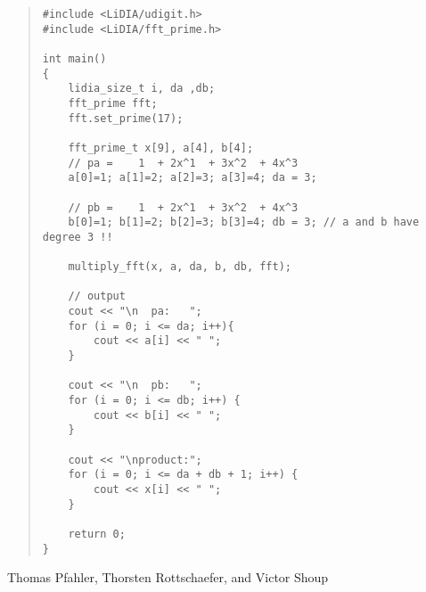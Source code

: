 \begin{quote}
\begin{verbatim}
#include <LiDIA/udigit.h>
#include <LiDIA/fft_prime.h>

int main()
{
    lidia_size_t i, da ,db;
    fft_prime fft;
    fft.set_prime(17);

    fft_prime_t x[9], a[4], b[4];
    // pa =    1  + 2x^1  + 3x^2  + 4x^3
    a[0]=1; a[1]=2; a[2]=3; a[3]=4; da = 3;

    // pb =    1  + 2x^1  + 3x^2  + 4x^3
    b[0]=1; b[1]=2; b[2]=3; b[3]=4; db = 3; // a and b have degree 3 !!

    multiply_fft(x, a, da, b, db, fft);

    // output
    cout << "\n  pa:   ";
    for (i = 0; i <= da; i++){
        cout << a[i] << " ";
    }

    cout << "\n  pb:   ";
    for (i = 0; i <= db; i++) {
        cout << b[i] << " ";
    }

    cout << "\nproduct:";
    for (i = 0; i <= da + db + 1; i++) {
        cout << x[i] << " ";
    }

    return 0;
}
\end{verbatim}
\end{quote}


\AUTHOR

Thomas Pfahler, Thorsten Rottschaefer, and Victor Shoup
